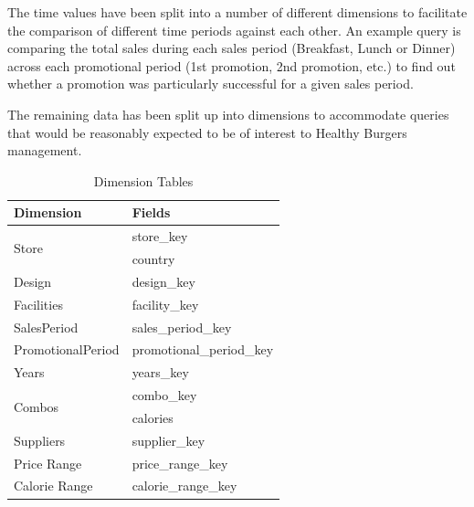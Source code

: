 \documentclass[12pt, a4paper]{article}
\begin{document}
The time values have been split into a number of different dimensions to facilitate the comparison of different time periods against each other. An example query is comparing the total sales during each sales period (Breakfast, Lunch or Dinner) across each promotional period (1st promotion, 2nd promotion, etc.) to find out whether a promotion was particularly successful for a given sales period.

The remaining data has been split up into dimensions to accommodate queries that would be reasonably expected to be of interest to Healthy Burgers management. 

\begin{table}

\begin{tabular}{| l | l |}
\hline
\textbf{Dimension} & \textbf{Fields} \\
\hline

\multirow{2}{3cm}{Store} & store\_key \\
& country \\
\hline

Design & design\_key \\ 
\hline

Facilities & facility\_key \\
\hline

SalesPeriod & sales\_period\_key \\
\hline

PromotionalPeriod & promotional\_period\_key \\
\hline

Years & years\_key \\
\hline

\multirow{2}{3cm}{Combos} & combo\_key \\
& calories \\
\hline

Suppliers & supplier\_key \\
\hline

Price Range & price\_range\_key \\
\hline

Calorie Range & calorie\_range\_key \\
\hline

\end{tabular}
\caption{Dimension Tables}
\label{tab:dimensions}

\end{table}
\end{document}
